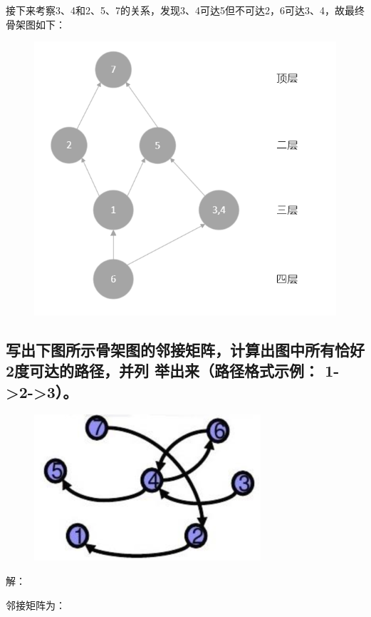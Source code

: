 \documentclass[UTF8]{ctexart}
\begin{document}
接下来考察3、4和2、5、7的关系，发现3、4可达5但不可达2，6可达3、4，故最终骨架图如下：

\begin{figure}[H]
  \centering
  \includegraphics[scale=0.8]{5.png}
\end{figure}

\subsection{写出下图所示骨架图的邻接矩阵，计算出图中所有恰好2度可达的路径，并列
举出来（路径格式示例： 1->2->3）。}

\begin{figure}[H]
  \centering
  \includegraphics[scale=1]{6.png}
\end{figure}

\noindent 解：

邻接矩阵为：
\end{document}

